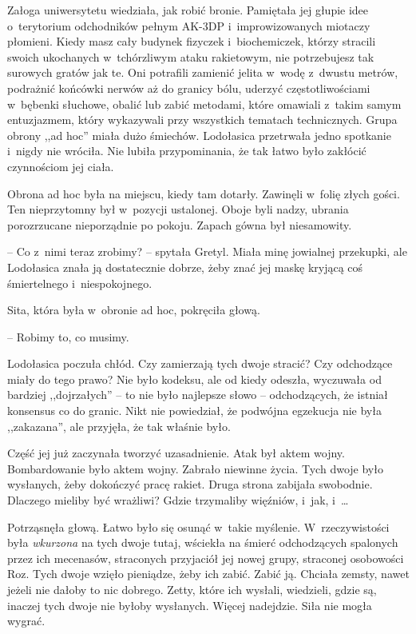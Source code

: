 \documentclass[oneside,polish,11pt,sfheadings]{mwbk}
\begin{document}
Załoga uniwersytetu wiedziała, jak robić bronie. Pamiętała jej głupie
idee o~terytorium odchodników pełnym AK-3DP i~improwizowanych miotaczy
płomieni. Kiedy masz cały budynek fizyczek i~biochemiczek, którzy
stracili swoich ukochanych w~tchórzliwym ataku rakietowym, nie
potrzebujesz tak surowych gratów jak te. Oni potrafili zamienić jelita w~wodę z~dwustu metrów, podrażnić końcówki nerwów aż do granicy bólu,
uderzyć częstotliwościami w~bębenki słuchowe, obalić lub zabić metodami,
które omawiali z~takim samym entuzjazmem, który wykazywali przy
wszystkich tematach technicznych. Grupa obrony ,,ad hoc'' miała dużo
śmiechów. Lodołasica przetrwała jedno spotkanie i~nigdy nie wróciła. Nie
lubiła przypominania, że tak łatwo było zakłócić czynnościom jej ciała.

Obrona ad hoc była na miejscu, kiedy tam dotarły. Zawinęli w~folię złych
gości. Ten nieprzytomny był w~pozycji ustalonej. Oboje byli nadzy,
ubrania porozrzucane nieporządnie po pokoju. Zapach gówna był
niesamowity.

-- Co z~nimi teraz zrobimy? -- spytała Gretyl. Miała minę jowialnej
przekupki, ale Lodołasica znała ją dostatecznie dobrze, żeby znać jej
maskę kryjącą coś śmiertelnego i~niespokojnego.

Sita, która była w~obronie ad hoc, pokręciła głową. 

-- Robimy to, co
musimy.

Lodołasica poczuła chłód. Czy zamierzają tych dwoje stracić? Czy
odchodzące miały do tego prawo? Nie było kodeksu, ale od kiedy odeszła,
wyczuwała od bardziej ,,dojrzałych'' -- to nie było najlepsze słowo -- odchodzących, że istniał konsensus co do granic. Nikt nie powiedział, że
podwójna egzekucja nie była ,,zakazana'', ale przyjęła, że tak właśnie
było.

Część jej już zaczynała tworzyć uzasadnienie. Atak był aktem wojny.
Bombardowanie było aktem wojny. Zabrało niewinne życia. Tych dwoje było
wysłanych, żeby dokończyć pracę rakiet. Druga strona zabijała swobodnie.
Dlaczego mieliby być wrażliwi? Gdzie trzymaliby więźniów, i~jak, i~\ldots 

Potrząsnęła głową. Łatwo było się osunąć w~takie myślenie. W~rzeczywistości była \textit{wkurzona} na tych dwoje tutaj, wściekła na
śmierć odchodzących spalonych przez ich mecenasów, straconych przyjaciół
jej nowej grupy, straconej osobowości Roz. Tych dwoje wzięło pieniądze,
żeby ich zabić. Zabić ją. Chciała zemsty, nawet jeżeli nie dałoby to nic
dobrego. Zetty, które ich wysłali, wiedzieli, gdzie są, inaczej tych
dwoje nie byłoby wysłanych. Więcej nadejdzie. Siła nie mogła wygrać.
\end{document}
